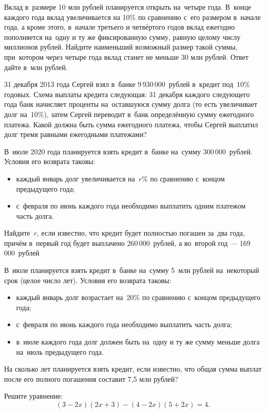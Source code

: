 %
Вклад в~размере 10 млн рублей планируется открыть на~четыре года. В~конце каждого года вклад увеличивается 
на 10\% по сравнению с~его размером в~начале года, а кроме этого, в~начале третьего и четвёртого годов вклад 
ежегодно пополняется на~одну и ту же фиксированную сумму, равную целому числу миллионов рублей. 
Найдите наименьший возможный размер такой суммы, при~котором через четыре года 
вклад станет не меньше 30 млн рублей. Ответ дайте в~млн рублей.

%
31 декабря 2013 года Сергей взял в~банке 9\,930\,000~рублей в~кредит под~10\% годовых. 
Схема выплаты кредита следующая: 31 декабря каждого следующего года банк начисляет проценты на~оставшуюся сумму долга 
(то есть увеличивает долг на~10\%), затем Сергей переводит в~банк определённую сумму ежегодного платежа. 
Какой должна быть сумма ежегодного платежа, чтобы Сергей выплатил долг тремя равными ежегодными платежами? 

%
В~июле 2020 года планируется взять кредит в~банке на~сумму 300\,000~рублей. Условия его возврата таковы:
\begin{itemize}
    \item каждый январь долг увеличивается на~$r\%$ по сравнению с~концом предыдущего года;
    \item с~февраля по июнь каждого года необходимо выплатить одним платежом часть долга.
\end{itemize}
Найдите~$r$, если известно, что кредит будет полностью погашен за~два года, причём в~первый год будет выплачено 260\,000~рублей, а во~второй год — 169\,000~рублей

%
В~июле планируется взять кредит в~банке на~сумму 5~млн рублей на~некоторый срок (целое число лет). Условия его возврата таковы: 
\begin{itemize}
    \item каждый январь долг возрастает на~20\% по сравнению с~концом предыдущего года; 
    \item с~февраля по июнь каждого года необходимо выплатить часть долга; 
    \item в~июле каждого года долг должен быть на~одну и ту же сумму меньше долга на~июль предыдущего года. 
\end{itemize}
На сколько лет планируется взять кредит, если известно, что общая сумма выплат после его полного погашения составит 7{,}5 млн рублей?

%
Решите уравнение:
$$(3-2x)(2x+3) - (4-2x)(5+2x) = 4.$$

